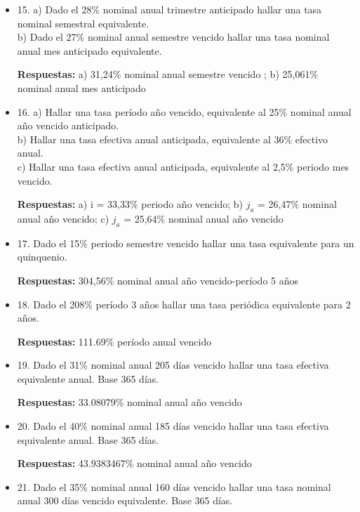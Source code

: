 \begin{itemize}
       \textbf{Respuestas:} a) 2,83\%  período mes anticipado; b) 3,093\% nominal anual mes vencido 
       \medskip

 \item 15. a) Dado el 28\% nominal anual trimestre anticipado hallar una tasa nominal semestral equivalente.\\
 b) Dado el 27\% nominal anual semestre vencido hallar una tasa nominal anual mes anticipado equivalente.
 
       \textbf{Respuestas:} a) 31,24\% nominal anual semestre vencido  ; b) 25,061\% nominal anual mes anticipado
       \medskip

 \item 16. a) Hallar una tasa período año vencido, equivalente al 25\% nominal anual año vencido anticipado.\\
    b) Hallar una tasa efectiva anual anticipada, equivalente al 36\% efectivo anual. \\
    c) Hallar una tasa efectiva anual anticipada, equivalente al 2,5\% periodo mes vencido.
    
       \textbf{Respuestas:} a) i = 33,33\% periodo año vencido; b) $j_{a}$ = 26,47\%  nominal anual año vencido; c) $j_{a}$ = 25,64\%  nominal anual año vencido
       \medskip

 \item 17. Dado el 15\%  periodo semestre vencido hallar una tasa equivalente para un quinquenio.
 
       \textbf{Respuestas:} 304,56\% nominal anual año vencido-período 5 años 
       \medskip

 \item 18. Dado el 208\% período 3 años hallar una tasa periódica equivalente para 2 años.
 
       \textbf{Respuestas:} 111.69\% período anual vencido
       \medskip

 \item 19. Dado el 31\% nominal anual 205 días vencido hallar una tasa efectiva equivalente anual. Base 365 días.
 
       \textbf{Respuestas:} 33.08079\% nominal anual año vencido 
       \medskip

 \item 20. Dado el 40\% nominal anual 185 días vencido hallar una tasa efectiva equivalente anual. Base 365 días.
 
       \textbf{Respuestas:} 43.9383467\% nominal anual año vencido 
       \medskip

 \item 21. Dado el 35\% nominal anual 160 días vencido hallar una tasa nominal anual 300 días vencido equivalente. Base 365 días.
 

\end{itemize}
